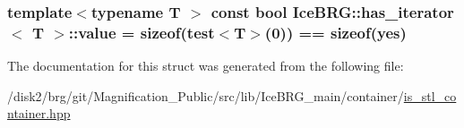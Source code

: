 \subsubsection[{value}]{\setlength{\rightskip}{0pt plus 5cm}template$<$typename T $>$ const bool {\bf Ice\+B\+R\+G\+::has\+\_\+iterator}$<$ T $>$\+::value = sizeof(test$<$T$>$(0)) == sizeof(yes)\hspace{0.3cm}{\ttfamily [static]}}\label{structIceBRG_1_1has__iterator_a36bdd1f7f821776f7a1bb84a6749b2c6}


The documentation for this struct was generated from the following file\+:\begin{DoxyCompactItemize}
\item 
/disk2/brg/git/\+Magnification\+\_\+\+Public/src/lib/\+Ice\+B\+R\+G\+\_\+main/container/\hyperlink{is__stl__container_8hpp}{is\+\_\+stl\+\_\+container.\+hpp}\end{DoxyCompactItemize}
